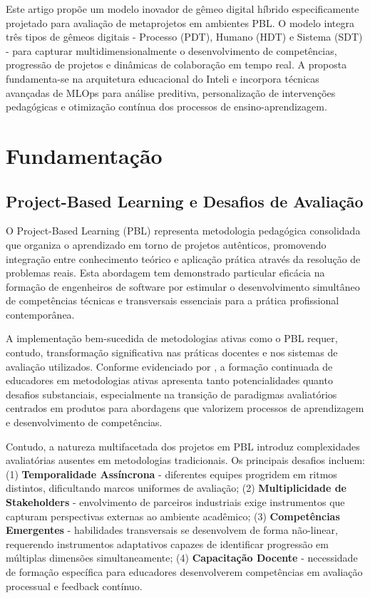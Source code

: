 \documentclass[english, spanish, brazilian]{RBIEarticle} %
\begin{document}
Este artigo propõe um modelo inovador de gêmeo digital híbrido especificamente
projetado para avaliação de metaprojetos em ambientes PBL. O modelo integra
três tipos de gêmeos digitais - Processo (PDT), Humano (HDT) e Sistema (SDT) -
para capturar multidimensionalmente o desenvolvimento de competências,
progressão de projetos e dinâmicas de colaboração em tempo real. A proposta
fundamenta-se na arquitetura educacional do Inteli e incorpora técnicas
avançadas de MLOps para análise preditiva, personalização de intervenções
pedagógicas e otimização contínua dos processos de ensino-aprendizagem.

\section{Fundamentação}

\subsection{Project-Based Learning e Desafios de Avaliação}

\indent

O Project-Based Learning (PBL) representa metodologia pedagógica consolidada
que organiza o aprendizado em torno de projetos autênticos, promovendo
integração entre conhecimento teórico e aplicação prática através da resolução
de problemas reais. Esta abordagem tem demonstrado particular eficácia na
formação de engenheiros de software por estimular o desenvolvimento simultâneo
de competências técnicas e transversais essenciais para a prática profissional
contemporânea.

A implementação bem-sucedida de metodologias ativas como o PBL requer, contudo,
transformação significativa nas práticas docentes e nos sistemas de avaliação
utilizados. Conforme evidenciado por \cite{FormacaoEducadores2024}, a formação
continuada de educadores em metodologias ativas apresenta tanto potencialidades
quanto desafios substanciais, especialmente na transição de paradigmas
avaliatórios centrados em produtos para abordagens que valorizem processos de
aprendizagem e desenvolvimento de competências.

Contudo, a natureza multifacetada dos projetos em PBL introduz complexidades
avaliatórias ausentes em metodologias tradicionais. Os principais desafios
incluem: (1) \textbf{Temporalidade Assíncrona} - diferentes equipes progridem
em ritmos distintos, dificultando marcos uniformes de avaliação; (2)
\textbf{Multiplicidade de Stakeholders} - envolvimento de parceiros industriais
exige instrumentos que capturam perspectivas externas ao ambiente acadêmico;
(3) \textbf{Competências Emergentes} - habilidades transversais se desenvolvem
de forma não-linear, requerendo instrumentos adaptativos capazes de identificar
progressão em múltiplas dimensões simultaneamente; (4) \textbf{Capacitação
  Docente} - necessidade de formação específica para educadores desenvolverem
competências em avaliação processual e feedback contínuo.
\end{document}
